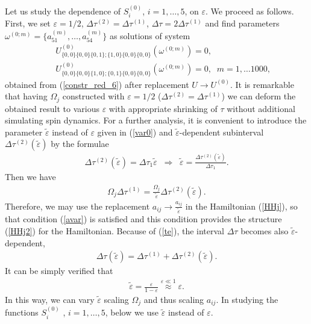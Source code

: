 \documentclass[pra,preprint,showpacs]{revtex4-1}
\begin{document}
{{Let us study the dependence of $S_i^{(0)}$, $i=1,\dots,5$, on $\varepsilon$.
We proceed as follows.
First, we set  $ \varepsilon=1/2$, $\Delta\tau^{(2)}= \Delta\tau^{(1)}$, $\Delta\tau=2  \Delta\tau^{(1)}$ and  find parameters $\omega^{(0;m)}=\{a_{51}^{(m)},\dots,a_{54}^{(m)}\} $  as solutions of  system
\begin{eqnarray}\label{constr_red_6_2}
&&
U^{(0)}_{\{0,0\}\{0,0\}\{0,1\};\{1,0\}\{0,0\}\{0,0\}}(\omega^{(0;m)})= 0,\\\nonumber
&&
U^{(0)}_{\{0,0\}\{0,0\}\{1,0\};\{0,1\}\{0,0\}\{0,0\}}(\omega^{(0;m)})= 0,\;\;m=1,\dots 1000,
\end{eqnarray}
obtained from (\ref{constr_red_6}) after replacement $U\to U^{(0)}$.
It is remarkable that having $\Omega_j$ constructed with $\varepsilon =1/2$ ($\Delta\tau^{(2)}= \Delta\tau^{(1)}$) we can deform the obtained result to various $\varepsilon$ with appropriate shrinking of $\tau$ without additional  simulating spin dynamics.
For a further analysis, it is convenient to introduce the parameter $\tilde\varepsilon$ instead of $\varepsilon$ given in  (\ref{var0}) and $\tilde\varepsilon$-dependent subinterval $\Delta\tau^{(2)}(\tilde\varepsilon)$ by the formulae
\begin{eqnarray}\label{te}
\Delta\tau^{(2)}(\tilde\varepsilon)  =\Delta\tau_1 \tilde\varepsilon \;\;\Rightarrow \;\;
\tilde \varepsilon = \frac{\Delta\tau^{(2)}(\tilde\varepsilon) }{\Delta\tau_1}.
\end{eqnarray}
Then we have
\begin{eqnarray}
\Omega_j \Delta \tau^{(1)} = \frac{\Omega_j}{\tilde\varepsilon} \Delta\tau^{(2)}(\tilde\varepsilon).
\end{eqnarray}
Therefore, we may use  the replacement  $\displaystyle a_{ij} \to \frac{a_{ij}}{\tilde\varepsilon}$ in the Hamiltonian (\ref{HHj}), so that condition (\ref{avar}) is satisfied and this condition provides  the structure (\ref{HHj2}) for the Hamiltonian.
Because of (\ref{te}), the interval $\Delta\tau$ becomes also $\tilde\varepsilon$-dependent,
\begin{eqnarray}\label{dt12}
\Delta \tau(\tilde\varepsilon) = \Delta\tau^{(1)} +\Delta\tau^{(2)}(\tilde\varepsilon).
\end{eqnarray}
It can be simply verified that
\begin{eqnarray}
\tilde \varepsilon = \frac{\varepsilon}{1-\varepsilon}\stackrel{\varepsilon\ll 1}{ \approx} \varepsilon .
\end{eqnarray}
In this way, we can vary $\tilde \varepsilon$ scaling $\Omega_j$ and thus scaling $a_{ij}$. In studying the functions $S_i^{(0)}$ , $i=1,\dots,5$, below we use $\tilde\varepsilon$ instead of $\varepsilon$.

}}
\end{document}
